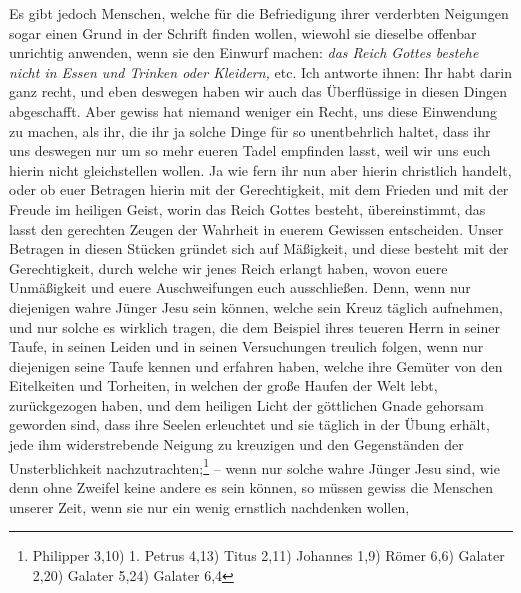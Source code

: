  Es gibt jedoch Menschen, welche für die
Befriedigung ihrer verderbten Neigungen
sogar einen Grund in der Schrift finden wollen, wiewohl sie dieselbe offenbar
unrichtig anwenden, wenn sie den Einwurf machen:
\textit{das Reich Gottes bestehe nicht
in Essen und Trinken oder Kleidern,} etc. Ich antworte ihnen: Ihr habt darin
ganz
recht, und eben deswegen haben wir auch das Überflüssige in diesen Dingen
abgeschafft. Aber gewiss hat niemand weniger ein Recht, uns diese Einwendung zu
machen, als ihr, die ihr ja solche Dinge für so unentbehrlich haltet, dass ihr
uns deswegen nur um so mehr eueren Tadel empfinden lasst, weil wir uns euch
hierin nicht gleichstellen wollen. Ja wie fern ihr nun aber hierin christlich
handelt, oder ob euer Betragen hierin mit der Gerechtigkeit, mit dem Frieden und
mit der Freude im heiligen Geist, worin das
Reich Gottes besteht,
übereinstimmt, das lasst den gerechten Zeugen der Wahrheit in
euerem Gewissen
entscheiden. Unser Betragen in diesen Stücken gründet sich auf Mäßigkeit, und
diese besteht mit der Gerechtigkeit, durch welche wir jenes Reich
erlangt
haben, wovon euere Unmäßigkeit und euere Auschweifungen euch ausschließen. Denn,
wenn nur diejenigen wahre Jünger Jesu sein können, welche sein
Kreuz täglich
aufnehmen, und nur solche es wirklich tragen, die dem Beispiel ihres teueren
Herrn in seiner Taufe, in seinen Leiden und in seinen Versuchungen
treulich
folgen, wenn nur diejenigen seine Taufe kennen und erfahren haben, welche ihre
Gemüter von den Eitelkeiten und Torheiten, in welchen der große Haufen der Welt
lebt, zurückgezogen haben, und dem heiligen Licht der göttlichen
Gnade gehorsam
geworden sind, dass ihre Seelen erleuchtet und sie täglich in der Übung erhält,
jede ihm widerstrebende Neigung zu kreuzigen und den
Gegenständen der
Unsterblichkeit nachzutrachten;\footnote{Philipper 3,10)
1. Petrus 4,13)
Titus 2,11)
Johannes 1,9)
Römer 6,6)
Galater 2,20)
Galater 5,24)
Galater 6,4}
-- wenn nur solche wahre Jünger
Jesu sind, wie denn ohne Zweifel keine andere es sein können, so müssen gewiss
die Menschen unserer Zeit, wenn sie nur ein wenig ernstlich nachdenken wollen,
